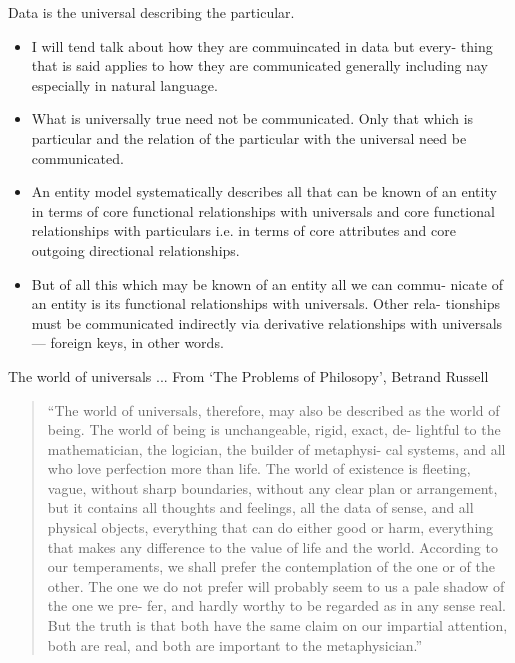 \begin{frame}{Data is the universal describing the particular.}
\begin{itemize}
\item I will tend talk about how they are commuincated in data but every-
thing that is said applies to how they are communicated generally including nay
especially in natural language. 
\item
What is universally true need not be communicated. Only
that which is particular and the relation of the particular with the universal
need be communicated.
\item An entity model systematically describes all that can be known
of an entity in terms of core functional relationships with universals and core
functional relationships with particulars i.e. in terms of core attributes and core
outgoing directional relationships.
\item But of all this which may be known of an entity all we can commu-
nicate of an entity is its functional relationships with universals. Other rela-
tionships must be communicated indirectly via derivative
relationships with universals --- foreign keys, in other words.
\end{itemize}
\end{frame}




\begin{frame}{The world of universals ...}
From `The Problems of Philosopy', Betrand Russell
\begin{quote}
“The world of universals, therefore, may also be described as the
world of being. The world of being is unchangeable, rigid, exact, de-
lightful to the mathematician, the logician, the builder of metaphysi-
cal systems, and all who love perfection more than life. The world of
existence is fleeting, vague, without sharp boundaries, without any
clear plan or arrangement, but it contains all thoughts and feelings,
all the data of sense, and all physical objects, everything that can
do either good or harm, everything that makes any difference to the
value of life and the world. According to our temperaments, we shall
prefer the contemplation of the one or of the other. The one we do
not prefer will probably seem to us a pale shadow of the one we pre-
fer, and hardly worthy to be regarded as in any sense real. But the
truth is that both have the same claim on our impartial attention,
both are real, and both are important to the metaphysician.”
\end{quote}
\end{frame}



